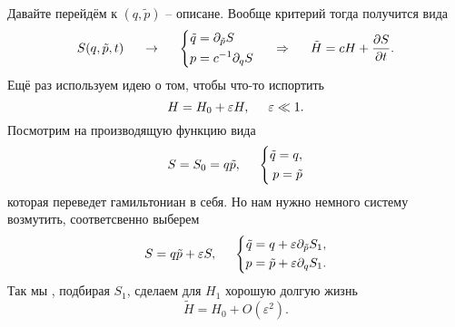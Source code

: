 Давайте перейдём к $(q, \tilde{p})$ -- описане. Вообще критерий тогда получится вида
\begin{equation*}
    S(q, \tilde{p}, t) 
    \hspace{5 mm} \to  \hspace{5 mm}
    \left\{\begin{aligned}
        \tilde{q} &= \partial_{\tilde{p}} S \\
        p &= c^{-1} \partial_q S
    \end{aligned}\right.
    \hspace{0.5cm} \Rightarrow \hspace{0.5cm}
    \tilde{H} = c H + \frac{\partial S}{\partial t}.
\end{equation*}
Ещё раз используем идею о том, чтобы что-то испортить
\begin{equation*}
    H = H_0 + \varepsilon H, \hspace{5 mm} \varepsilon \ll 1.
\end{equation*}
Посмотрим на производящую функцию вида
\begin{equation*}
    S = S_0 = q \tilde{p},
    \hspace{5 mm}
    \left\{\begin{aligned}
        \tilde{q} = q, \\
        p = \tilde{p}
    \end{aligned}\right.
\end{equation*}
которая переведет гамильтониан в себя. Но нам нужно немного систему возмутить, соответсвенно выберем
\begin{equation*}
    S = q \tilde{p} + \varepsilon S,
    \hspace{5 mm}
    \left\{\begin{aligned}
        \tilde{q} = q + \varepsilon \partial_{\tilde{p}} S_1, \\
        p = \tilde{p} + \varepsilon \partial_q S_1.
    \end{aligned}\right.
\end{equation*}
Так мы , подбирая $S_1$, сделаем для $H_1$ хорошую долгую жизнь
\begin{equation*}
    \tilde{H} = H_0 + O(\varepsilon^2).
\end{equation*}




 


% 
